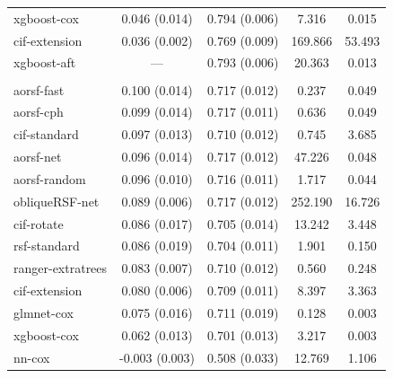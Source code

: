 \documentclass{article}\usepackage[]{graphicx}\usepackage[]{xcolor}
\newenvironment{knitrout}{}{} %
\begin{document}
\begin{knitrout}
\begin{longtable}[t]{lcccc}
\hspace{1em}xgboost-cox & 0.046 (0.014) & 0.794 (0.006) & 7.316 & 0.015\\
\hspace{1em}cif-extension & 0.036 (0.002) & 0.769 (0.009) & 169.866 & 53.493\\
\hspace{1em}xgboost-aft & --- & 0.793 (0.006) & 20.363 & 0.013\\
\addlinespace[0.3em]
\multicolumn{5}{l}{\textit{\textbf{Colon cancer; death, n = 929, p = 12}}}\\
\hline
\hspace{1em}aorsf-fast & 0.100 (0.014) & 0.717 (0.012) & 0.237 & 0.049\\
\hspace{1em}aorsf-cph & 0.099 (0.014) & 0.717 (0.011) & 0.636 & 0.049\\
\hspace{1em}cif-standard & 0.097 (0.013) & 0.710 (0.012) & 0.745 & 3.685\\
\hspace{1em}aorsf-net & 0.096 (0.014) & 0.717 (0.012) & 47.226 & 0.048\\
\hspace{1em}aorsf-random & 0.096 (0.010) & 0.716 (0.011) & 1.717 & 0.044\\
\hspace{1em}obliqueRSF-net & 0.089 (0.006) & 0.717 (0.012) & 252.190 & 16.726\\
\hspace{1em}cif-rotate & 0.086 (0.017) & 0.705 (0.014) & 13.242 & 3.448\\
\hspace{1em}rsf-standard & 0.086 (0.019) & 0.704 (0.011) & 1.901 & 0.150\\
\hspace{1em}ranger-extratrees & 0.083 (0.007) & 0.710 (0.012) & 0.560 & 0.248\\
\hspace{1em}cif-extension & 0.080 (0.006) & 0.709 (0.011) & 8.397 & 3.363\\
\hspace{1em}glmnet-cox & 0.075 (0.016) & 0.711 (0.019) & 0.128 & 0.003\\
\hspace{1em}xgboost-cox & 0.062 (0.013) & 0.701 (0.013) & 3.217 & 0.003\\
\hspace{1em}nn-cox & -0.003 (0.003) & 0.508 (0.033) & 12.769 & 1.106\\

\end{longtable}
\end{knitrout}
\end{document}
